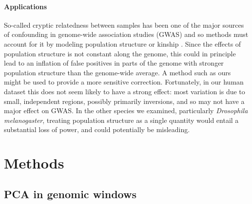 \documentclass[11pt, oneside]{article}   	%
\begin{document}
\paragraph{Applications}
So-called cryptic relatedness between samples
has been one of the major sources of confounding in genome-wide association studies (GWAS)
and so methods must account for it by modeling population structure or kinship \citep{astle2009population,yang2014advantages}.
Since the effects of population structure is not constant along the genome,
this could in principle lead to an inflation of false positives in parts of the genome
with stronger population structure than the genome-wide average.
A method such as ours might be used to provide a more sensitive correction.
Fortunately, in our human dataset this does not seem likely to have a strong effect:
most variation is due to small, independent regions, possibly primarily inversions,
and so may not have a major effect on GWAS.
In the other species we examined, particularly \textit{Drosophila melanogaster},
treating population structure as a single quantity would entail a substantial loss of power,
and could potentially be misleading.

\section{Methods}



\subsection{PCA in genomic windows}
\end{document}
